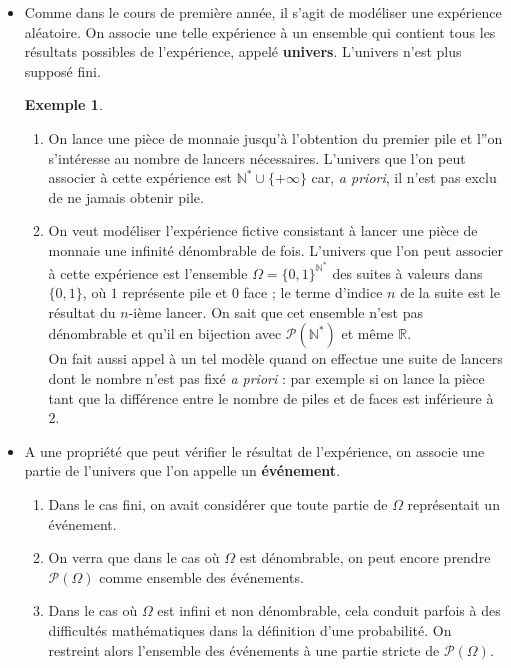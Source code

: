 \documentclass[french]{article}
\newcommand{\N}{\mathbb{N}}
\newcommand{\R}{\mathbb{R}}
\newcommand{\st}{^*}
\theoremstyle{plain}
\theoremstyle{definition}
\newtheorem*{ex}{Exemple}
\theoremstyle{remark}
\begin{document}
\begin{itemize}
	\item Comme dans le cours de première année, il s'agit de modéliser une expérience aléatoire. On associe une telle expérience à un ensemble qui contient tous les résultats possibles de l'expérience, appelé \textbf{univers}. L'univers n'est plus supposé fini.
	\begin{ex}
		\begin{enumerate}
			\item On lance une pièce de monnaie jusqu'à l'obtention du premier pile et l''on s'intéresse au nombre de lancers nécessaires. L'univers que l'on peut associer à cette expérience est $\N\st\cup\{+\infty\}$ car, \textit{a priori}, il n'est pas exclu de ne jamais obtenir pile.
			\item On veut modéliser l'expérience fictive consistant à lancer une pièce de monnaie une infinité dénombrable de fois. L'univers que l'on peut associer à cette expérience est l'ensemble $\Omega=\{0,1\}^{\N\st}$ des suites à valeurs dans $\{0,1\}$, où $1$ représente pile et $0$ face ; le terme d'indice $n$ de la suite est le résultat du $n$-ième lancer. On sait que cet ensemble n'est pas dénombrable et qu'il en bijection avec $\mathcal{P}(\N\st)$ et même $\R$.\\
			On fait aussi appel à un tel modèle quand on effectue une suite de lancers dont le nombre n'est pas fixé \textit{a priori} : par exemple si on lance la pièce tant que la différence entre le nombre de piles et de faces est inférieure à $2$.
		\end{enumerate}
	\end{ex}
	\item A une propriété que peut vérifier le résultat de l'expérience, on associe une partie de l'univers que l'on appelle un \textbf{événement}.
	\begin{enumerate}[label=$\star$]
		\item Dans le cas fini, on avait considérer que toute partie de $\Omega$ représentait un événement.
		\item On verra que dans le cas où $\Omega$ est dénombrable, on peut encore prendre $\mathcal{P}(\Omega)$ comme ensemble des événements.
		\item Dans le cas où $\Omega$ est infini et non dénombrable, cela conduit parfois à des difficultés mathématiques dans la définition d'une probabilité. On restreint alors l'ensemble des événements à une partie stricte de $\mathcal{P}(\Omega)$.
	\end{enumerate}
\end{itemize}
\end{document}
